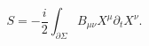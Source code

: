\begin{equation}
S=-\frac{i}{2}\int_{\partial\Sigma}B_{\mu\nu}X^{\mu}\partial_{t}X^{\nu
}.\label{6}%
\end{equation}

